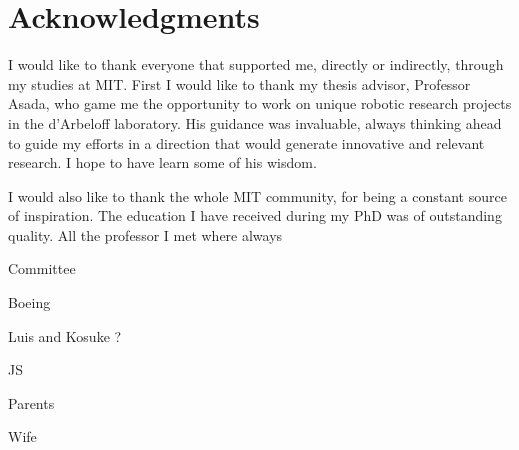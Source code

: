\section*{Acknowledgments}

I would like to thank everyone that supported me, directly or indirectly, through my studies at MIT. First I would like to thank my thesis advisor, Professor Asada, who game me the opportunity to work on unique robotic research projects in the d'Arbeloff laboratory. His guidance was invaluable, always thinking ahead to guide my efforts in a direction that would generate innovative and relevant research. I hope to have learn some of his wisdom. 

I would also like to thank the whole MIT community, for being a constant source of inspiration. The education I have received during my PhD was of outstanding quality. All the professor I met where always 

Committee

Boeing

Luis and Kosuke ?

JS

Parents

Wife